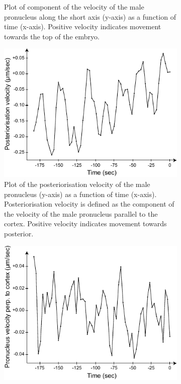 \begin{figure}[h]
\begin{subfigure}[t]{0.45\textwidth}
    \caption{Plot of component of the velocity of the male pronucleus along the short axis (y-axis) as a function of time (x-axis). Positive velocity indicates movement towards the top of the embryo.} 
    \label{subfig:malePronucleusTrackingVelocities-vyVsTime}
\end{subfigure}

\begin{subfigure}[t]{0.45\textwidth}
    \centering
    \includegraphics[width=\textwidth]{ExpMethods/FigTrackNucleus/postVelVsTime.pdf}
    \caption{Plot of the posteriorisation velocity of the male pronucleus (y-axis) as a function of time (x-axis). Posteriorisation velocity is defined as the component of the velocity of the male pronucleus parallel to the cortex. Positive velocity indicates movement towards posterior.} 
    \label{subfig:malePronucleusTrackingVelocities-postVelVsTime}
\end{subfigure}
\hfill
\begin{subfigure}[t]{0.45\textwidth}
    \centering
    \includegraphics[width=\textwidth]{ExpMethods/FigTrackNucleus/perpVelVsTime.pdf}

\end{subfigure}
\end{figure}
